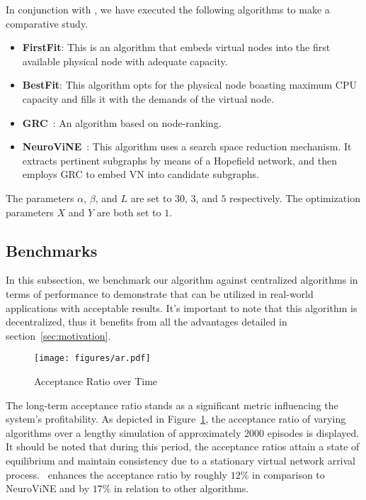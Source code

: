 In conjunction with \ourAlg, we have executed the following algorithms to make a comparative study.
\begin{itemize}[leftmargin=*]
    \item \textbf{FirstFit}: This is an algorithm that embeds virtual nodes into the first available physical node with adequate capacity.
    \item \textbf{BestFit}: This algorithm opts for the physical node boasting maximum CPU capacity and fills it with the demands of the virtual node.
    \item \textbf{GRC}~\cite{grc}: An algorithm based on node-ranking.
    \item \textbf{NeuroViNE}~\cite{neurovine}: This algorithm uses a search space reduction mechanism. It extracts pertinent subgraphs by means of a Hopefield network, and then employs GRC to embed VN into candidate subgraphs.
\end{itemize}
The parameters $\alpha$, $\beta$, and $L$ are set to $30$, $3$, and $5$ respectively. The optimization parameters $X$ and $Y$ are both set to $1$.


\subsection{Benchmarks}
In this subsection, we benchmark our algorithm against centralized algorithms in terms of performance to demonstrate that {\ourAlg} can be utilized in real-world applications with acceptable results. It's important to note that this algorithm is decentralized, thus it benefits from all the advantages detailed in section~\ref{sec:motivation}.


\begin{figure}[t]
	\centering
	\texttt{[image: figures/ar.pdf]}
	\caption{Acceptance Ratio over Time}
	\label{fig:ar}
\end{figure}
The long-term acceptance ratio stands as a significant metric influencing the system's profitability. As depicted in Figure~\ref{fig:ar}, the acceptance ratio of varying algorithms over a lengthy simulation of approximately $2000$ episodes is displayed. It should be noted that during this period, the acceptance ratios attain a state of equilibrium and maintain consistency due to a stationary virtual network arrival process. \ourAlg\ enhances the acceptance ratio by roughly $12\%$ in comparison to NeuroViNE and by $17\%$ in relation to other algorithms.


